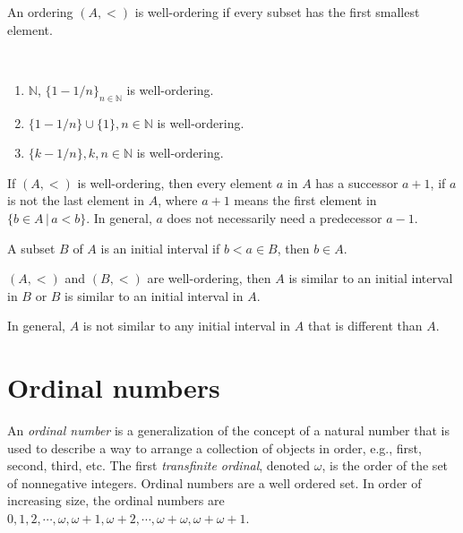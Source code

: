 \begin{definition}
An ordering $(A,<)$ is well-ordering if every subset has the first smallest element.
\end{definition}

\medskip

\begin{example}
~\begin{enumerate}[label=(\alph*)]
    \item $\mathbb{N}$, $\{1 - 1/n\}_{n \in \mathbb{N}}$ is well-ordering.
    
    \item $\{1 - 1/n\} \cup \{1\}, n \in \mathbb{N}$ is well-ordering.
    
    \item $\{k - 1/n\}, k,n \in \mathbb{N}$ is well-ordering.
\end{enumerate}
\end{example}

\medskip

If $(A,<)$ is well-ordering, then every element $a$ in $A$ has a successor $a+1$, if $a$ is not the last element in $A$, where $a+1$ means the first element in $\{b \in A\, | \, a < b\}$. In general, $a$ does not necessarily need a predecessor $a-1$.

\medskip

\begin{definition}
A subset $B$ of $A$ is an initial interval if $b < a \in B$, then $b \in A$.
\end{definition}

\medskip

\begin{theorem}
$(A,<)$ and $(B,<)$ are well-ordering, then $A$ is similar to an initial interval in $B$ or $B$ is similar to an initial interval in $A$.
\end{theorem}

\begin{remark}
In general, $A$ is not similar to any initial interval in $A$ that is different than $A$.
\end{remark}

\medskip


\section{Ordinal numbers}

An {\em ordinal number} is a generalization of the concept of a natural number that is used to describe a way to arrange a collection of objects in order, e.g., first, second, third, etc. The first {\em transfinite ordinal}, denoted $\omega$, is the order of the set of nonnegative integers. Ordinal numbers are a well ordered set. In order of increasing size, the ordinal numbers are $0, 1, 2, \cdots, \omega, \omega + 1, \omega + 2, \cdots, \omega + \omega, \omega + \omega + 1$.

